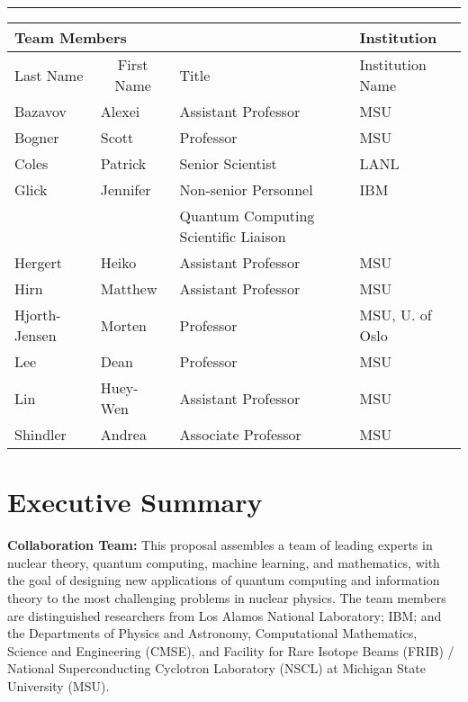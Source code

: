 \documentclass[11pt]{article}
\begin{document}
{
\rule{\linewidth}{1mm}
\begin{table}[hbtp]
\begin{center}
\begin{tabular}{|l|l|l|l|}
\hline
\multicolumn{3}{|l}{{\bf Team Members} } & \multicolumn{1}{|l|}{{\bf Institution}}\\
\hline
\multicolumn{1}{|l}{Last Name} & \multicolumn{1}{|c|}{First Name} & \multicolumn{1}{l|}{Title} & \multicolumn{1}{l|}{Institution Name} \\
\hline
Bazavov & Alexei & Assistant Professor & MSU \\
\hline
Bogner & Scott & Professor & MSU \\
\hline
Coles & Patrick & Senior Scientist & LANL \\
\hline
Glick & Jennifer & Non-senior Personnel & IBM \\
 & & Quantum Computing Scientific Liaison & \\
\hline
Hergert & Heiko & Assistant Professor & MSU \\
\hline
Hirn & Matthew & Assistant Professor & MSU \\
\hline
Hjorth-Jensen & Morten & Professor & MSU, U. of Oslo\\
\hline
Lee & Dean & Professor & MSU \\
\hline
Lin & Huey-Wen & Assistant Professor & MSU \\
\hline
Shindler & Andrea & Associate Professor & MSU \\
\hline

\end{tabular}
\end{center}
\end{table}

}
\pagestyle{empty}
\newpage
\section{Executive Summary}
\pagestyle{empty}


{\bf Collaboration Team:} This proposal assembles a team of leading experts 
in nuclear theory, quantum computing, machine learning, and mathematics, with 
the goal of designing new applications of quantum computing and information theory 
to the most challenging problems in nuclear physics. The team members are 
distinguished researchers from Los Alamos National Laboratory; IBM; and the 
Departments of Physics and Astronomy, Computational Mathematics, Science and 
Engineering (CMSE), and Facility for Rare Isotope Beams (FRIB) / National Superconducting Cyclotron Laboratory (NSCL) at 
Michigan State University (MSU).
\end{document}
